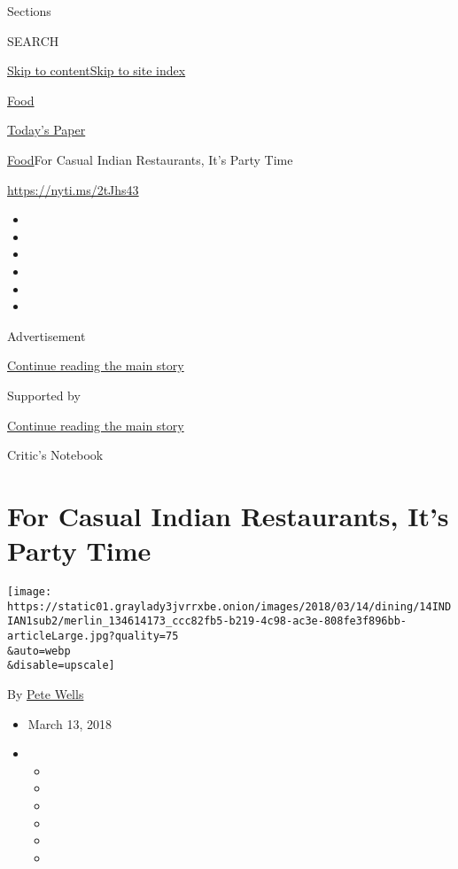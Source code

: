 Sections

SEARCH

\protect\hyperlink{site-content}{Skip to
content}\protect\hyperlink{site-index}{Skip to site index}

\href{https://www.nytimes3xbfgragh.onion/section/food}{Food}

\href{https://myaccount.nytimes3xbfgragh.onion/auth/login?response_type=cookie\&client_id=vi}{}

\href{https://www.nytimes3xbfgragh.onion/section/todayspaper}{Today's
Paper}

\href{/section/food}{Food}\textbar{}For Casual Indian Restaurants, It's
Party Time

\url{https://nyti.ms/2tJhs43}

\begin{itemize}
\item
\item
\item
\item
\item
\item
\end{itemize}

Advertisement

\protect\hyperlink{after-top}{Continue reading the main story}

Supported by

\protect\hyperlink{after-sponsor}{Continue reading the main story}

Critic's Notebook

\hypertarget{for-casual-indian-restaurants-its-party-time}{%
\section{For Casual Indian Restaurants, It's Party
Time}\label{for-casual-indian-restaurants-its-party-time}}

\texttt{[image: https://static01.graylady3jvrrxbe.onion/images/2018/03/14/dining/14INDIAN1sub2/merlin\_134614173\_ccc82fb5-b219-4c98-ac3e-808fe3f896bb-articleLarge.jpg?quality=75\\\&auto=webp\\\&disable=upscale]}

By \href{http://www.nytimes3xbfgragh.onion/by/pete-wells}{Pete Wells}

\begin{itemize}
\item
  March 13, 2018
\item
  \begin{itemize}
  \item
  \item
  \item
  \item
  \item
  \item
  \end{itemize}
\end{itemize}

